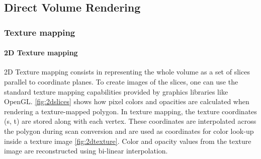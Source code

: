 \subsection{Direct Volume Rendering}

\subsubsection{Texture mapping}

\paragraph{2D Texture mapping}
2D Texture mapping consists in representing the whole volume as a set of slices parallel to coordinate planes. To create images of the slices, one can use the standard texture mapping capabilities provided by graphics libraries like OpenGL. \ref{fig:2dslices} shows how pixel colors and opacities are calculated when rendering a texture-mapped polygon. In texture mapping, the texture coordinates (s, t) are stored along with each vertex. These coordinates are interpolated across the polygon during scan conversion and are used as coordinates for color look-up inside a texture image \ref{fig:2dtexture}. Color and opacity values from the texture image are reconstructed using bi-linear interpolation.


